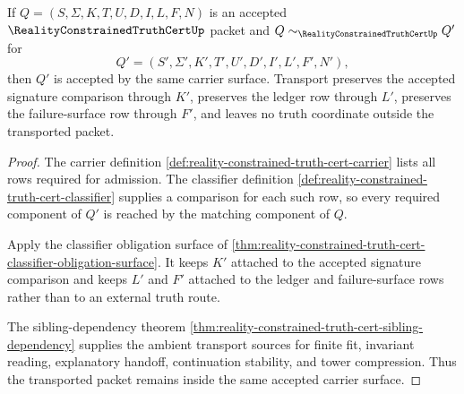 \begin{theorem}
\label{thm:reality-constrained-truth-cert-carrier-transport}
If $Q=(S,\Sigma,K,T,U,D,I,L,F,N)$ is an accepted
$\RealityConstrainedTruthCertUp$ packet and
$Q\sim_{\RealityConstrainedTruthCertUp}Q'$ for
$$
Q'=(S',\Sigma',K',T',U',D',I',L',F',N'),
$$
then $Q'$ is accepted by the same carrier surface. Transport preserves the
accepted signature comparison through $K'$, preserves the ledger row through
$L'$, preserves the failure-surface row through $F'$, and leaves no truth
coordinate outside the transported packet.
\end{theorem}
\begin{proof}
The carrier definition
\autoref{def:reality-constrained-truth-cert-carrier} lists all rows required for
admission. The classifier definition
\autoref{def:reality-constrained-truth-cert-classifier} supplies a comparison
for each such row, so every required component of $Q'$ is reached by the
matching component of $Q$.

Apply the classifier obligation surface of
\autoref{thm:reality-constrained-truth-cert-classifier-obligation-surface}. It
keeps $K'$ attached to the accepted signature comparison and keeps $L'$ and
$F'$ attached to the ledger and failure-surface rows rather than to an external
truth route.

The sibling-dependency theorem
\autoref{thm:reality-constrained-truth-cert-sibling-dependency} supplies the
ambient transport sources for finite fit, invariant reading, explanatory
handoff, continuation stability, and tower compression. Thus the transported
packet remains inside the same accepted carrier surface.
\end{proof}

